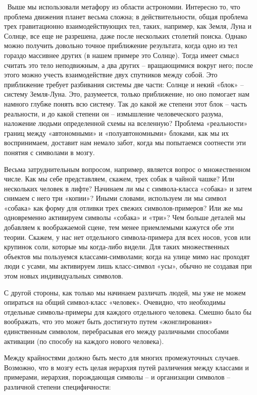\documentclass[../main.tex]{subfiles}
\begin{document}
~Выше мы использовали метафору из области астрономии. Интересно то, что проблема движения планет весьма сложна; в действительности, общая проблема трех гравитационно взаимодействующих тел, таких, например, как Земля, Луна и Солнце, все еще не разрешена, даже после нескольких столетий поиска. Однако можно получить довольно точное приближение результата, когда одно из тел гораздо массивнее других (в нашем примере это Солнце). Тогда имеет смысл считать это тело неподвижным, а два других \--- вращающимися вокруг него; после этого можно учесть взаимодействие двух спутников между собой. Это приближение требует разбивания системы две части: Солнце и некий «блок» \--- систему Земля-Луна. Это, разумеется, только приближение, но оно помогает нам намного глубже понять всю систему. Так до какой же степени этот блок \--- часть реальности, и до какой степени он \--- измышление человеческого разума, наложение людьми определенной схемы на вселенную? Проблема «реальности» границ между «автономными» и «полуавтономными» блоками, как мы их воспринимаем, доставит нам немало забот, когда мы попытаемся соотнести эти понятия с символами в мозгу.

Весьма затруднительным вопросом, например, является вопрос о множественном числе. Как мы себе представляем, скажем, трех собак в чайной чашке? Или нескольких человек в лифте? Начинаем ли мы с символа-класса «собака» и затем снимаем с него три «копии»? Иными словами, используем ли мы символ «собака» как форму для отливки трех свежих символов-примеров? Или же мы одновременно активируем символы «собака» и «три»? Чем больше деталей мы добавляем к воображаемой сцене, тем менее приемлемыми кажутся обе эти теории. Скажем, у нас нет отдельного символа-примера для всех носов, усов или крупинок соли, которые мы когда-либо видели. Для таких множественных объектов мы пользуемся классами-символами; когда на улице мимо нас проходят люди с усами, мы активируем лишь класс-символ «усы», обычно не создавая при этом новых индивидуальных символов.

С другой стороны, как только мы начинаем различать людей, мы уже не можем опираться на общий символ-класс «человек». Очевидно, что необходимы отдельные символы-примеры для каждого отдельного человека. Смешно было бы воображать, что это может быть достигнуто путем «жонглирования» единственным символом, перебрасывая его между различными способами активации (по способу на каждого нового человека).

Между крайностями должно быть место для многих промежуточных случаев. Возможно, что в мозгу есть целая иерархия путей различения между классами и примерами, иерархия, порождающая символы \--- и организации символов \--- различной степени специфичности:
\end{document}
